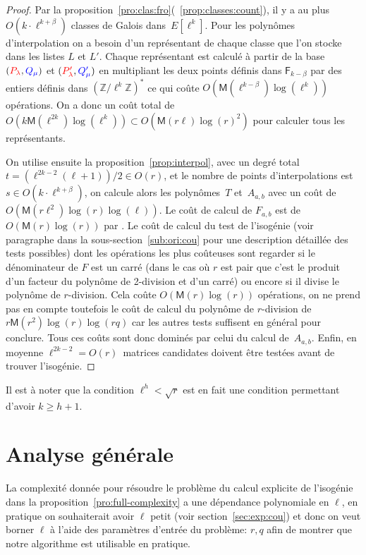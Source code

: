 \documentclass[10pt,a4paper]{book}
\theoremstyle{plain}
\theoremstyle{definition}
\theoremstyle{definition}
\theoremstyle{definition}
\theoremstyle{definition}
\theoremstyle{remark}
\theoremstyle{remark}
\theoremstyle{definition}
\begin{document}
\begin{proof}
  Par la proposition~\ref{pro:clas:fro}(~\ref{prop:classes:count}), il y a au 
  plus~$O(k \cdot \ell^{k+\beta})$ classes de Galois dans~$E[\ell^k]$. 
  Pour les polynômes d'interpolation on a besoin d'un représentant de chaque 
  classe que l'on stocke dans les listes $L$ et $L'$. Chaque représentant est
  calculé à partir de la base $(\color{red}P_{\lambda}\color{black},
  \color{blue}Q_{\mu}\color{black})$ et $(\color{red}P'_{\lambda}\color{black},
  \color{blue}Q'_{\mu}\color{black})$ en multipliant les deux points définis 
  dans $\mathsf{F}_{k-\beta}$ par des entiers définis dans 
  $\left( \mathbb{Z}/\ell^{k}\mathbb{Z}\right)^*$ ce qui coûte 
  $O(\mathsf{M}(\ell^{k-\beta})\log(\ell^k))$ opérations. On a donc un coût total de 
  $O(k\mathsf{M}(\ell^{2k})\log(\ell^k)) \subset O(\mathsf{M}(r\ell)\log(r)^2)$
  pour calculer tous les représentants.
  
  
  On utilise ensuite la proposition~\ref{prop:interpol}, avec un degré total
  ~$t = (\ell^{2k-2}(\ell+1))/2\in O(r)$, et le nombre de points d'interpolations
  est $s \in O(k \cdot \ell^{k+\beta})$, on calcule alors les polynômes~$T$
  et~$A_{a,b}$ avec un coût de~$O(\mathsf{M}(r \ell^2)\log(r)\log(\ell))$.  Le coût
  de calcul de $F_{a,b}$ est de $O(\mathsf{M}(r)\log(r))$ par 
  \cite[Théorème 7.5]{algeff17}. Le coût de calcul du test de l'isogénie (voir
  paragraphe dans la sous-section~\ref{sub:ori:cou} pour une description 
  détaillée des tests possibles) dont les opérations 
  les plus coûteuses sont regarder si le dénominateur de $F$ est un carré (dans
  le cas où $r$ est pair que c’est le produit d’un facteur du polynôme de 
  2-division et d’un carré) ou 
  encore si il divise le polynôme de $r$-division. Cela coûte $O(\mathsf{M}(r)
  \log(r))$ opérations, on ne prend pas en compte toutefois le coût de calcul
   du polynôme de $r$-division  de $r\mathsf{M}(r^2)\log(r)\log(r q)$ car 
  les autres tests suffisent en général pour conclure. Tous ces coûts sont donc
  dominés par celui du calcul de~$A_{a,b}$.  Enfin, en moyenne 
   ${\ell^{2k-2}=O(r)}$~matrices candidates doivent être testées
   avant de trouver l'isogénie.
\end{proof}
 
  Il est à noter que la condition $\ell^h<\sqrt{r}$ est en fait une condition 
  permettant d'avoir $k \geqslant h+1$.

\section{Analyse générale}
La complexité donnée pour résoudre le problème du calcul explicite de 
l'isogénie dans la proposition~\ref{pro:full-complexity} a une dépendance 
polynomiale en $\ell$, en pratique on souhaiterait avoir $\ell$ petit 
(voir section~\ref{sec:exp:cou})
et donc on veut borner $\ell$ à l'aide des paramètres d'entrée du problème: $r,q$
afin de montrer que notre algorithme est utilisable en pratique. 
\end{document}
